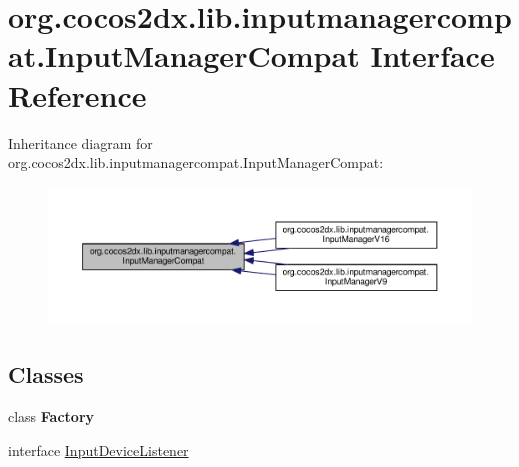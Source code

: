 \hypertarget{interfaceorg_1_1cocos2dx_1_1lib_1_1inputmanagercompat_1_1InputManagerCompat}{}\section{org.\+cocos2dx.\+lib.\+inputmanagercompat.\+Input\+Manager\+Compat Interface Reference}
\label{interfaceorg_1_1cocos2dx_1_1lib_1_1inputmanagercompat_1_1InputManagerCompat}


Inheritance diagram for org.\+cocos2dx.\+lib.\+inputmanagercompat.\+Input\+Manager\+Compat\+:
\nopagebreak
\begin{figure}[H]
\begin{center}
\leavevmode
\includegraphics[width=350pt]{interfaceorg_1_1cocos2dx_1_1lib_1_1inputmanagercompat_1_1InputManagerCompat__inherit__graph}
\end{center}
\end{figure}
\subsection*{Classes}
\begin{DoxyCompactItemize}
\item 
class {\bfseries Factory}
\item 
interface \hyperlink{interfaceorg_1_1cocos2dx_1_1lib_1_1inputmanagercompat_1_1InputManagerCompat_1_1InputDeviceListener}{Input\+Device\+Listener}
\end{DoxyCompactItemize}
